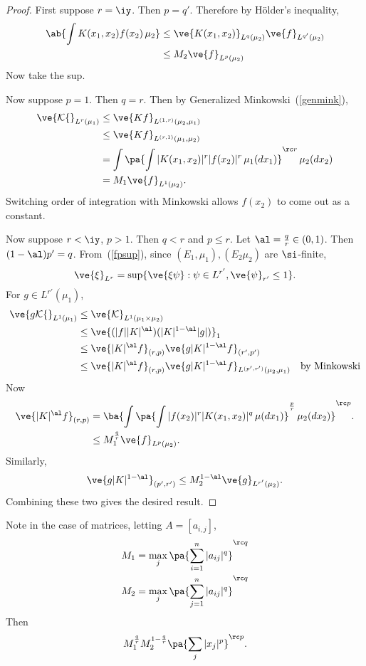 \begin{proof}
First suppose $r=\iy$. Then $p=q'$. Therefore by H\"older's inequality,
\begin{align*}
\ab{\int K(x_1,x_2)f(x_2)\,\mu_2}&\le \ve{K(x_1,x_2)}_{L^q(\mu_2)}\ve{f}_{L^{q'}(\mu_2)}\\
&\le M_2\ve{f}_{L^{p}(\mu_2)}
\end{align*}
Now take the sup.

Now suppose $p=1$. Then $q=r$. Then by Generalized Minkowski~(\ref{genmink}),
\begin{align*}
\ve{\cal K f}_{L^r(\mu_1)}&\le \ve{Kf}_{L^{(1,r)} (\mu_2,\mu_1)}\\
&\le\ve{Kf}_{L^{(r,1)}(\mu_1,\mu_2)}\\
&=\int\pa{\int |K(x_1,x_2)|^r |f(x_2)|^r\,\mu_1(dx_1)}^{\rc r}\,\mu_2(dx_2)\\
&= M_1 \ve{f}_{L^1(\mu_2)}.
\end{align*}
Switching order of integration with Minkowski allows $f(x_2)$ to come out as a constant.

Now suppose $r<\iy$, $p>1$. Then $q<r$ and $p\le r$. Let $\al=\frac qr\in (0,1)$. Then $(1-\al)p'=q$. From~(\ref{fpsup}), since $(E_1, \mu_1), (E_2\mu_2)$ are $\si$-finite,
\[
\ve{\xi}_{L^r}=\sup\{\ve{\xi \psi}:\psi\in L^{r'}, \ve{\psi}_{r'}\le 1\}.
\]
For $g\in L^{r'}(\mu_1)$,
\begin{align*}
\ve{g\cal Kf}_{L^1(\mu_1)}&\le 
\ve{\cal K}_{L^1(\mu_1\times \mu_2)}\\
& \le \ve{
(|f||K|^{\al})(|K|^{1-\al} |g|)
}_1\\
&\le \ve{|K|^{\al}f}_{%
(r,p)}%
\ve{g|K|^{1-\al}f}_{(r',p')}\\
&\le \ve{|K|^{\al}f}_{%
(r,p)}%
\ve{g|K|^{1-\al}f}_{L^{(p',r')}(\mu_2,\mu_1)}&\text{by Minkowski}
\end{align*}
Now
\begin{align*}
\ve{|K|^{\al}f}_{
(r,p)}&=
\ba{
\int
\pa{\int 
|f(x_2)|^r |K(x_1,x_2)|^q\,\mu(dx_1)
}^{\frac pr}\,\mu_2(dx_2)
}^{\rc p}.\\
&\le M_1^{\frac qr} \ve{f}_{L^p(\mu_2)}. 
\end{align*}
Similarly,
\[
\ve{g|K|^{1-\al}}_{(p',r')}\le M_2^{1-\al}\ve{g}_{L^{r'}(\mu_2)}.
\]
Combining these two gives the desired result.
\end{proof}
Note in the case of matrices, letting $A=[a_{i,j}]$, 
\begin{align*}
M_1&=\max_j \pa{ \sum_{i=1}^n|a_{ij}|^q}^{\rc q}\\
M_2&=\max_j \pa{ \sum_{j=1}^n|a_{ij}|^q}^{\rc q}
\end{align*}
Then
\[
M_1^{\frac qr}M_2^{1-\frac qr}\pa{\sum_j |x_j|^p}^{\rc p}.
\]

